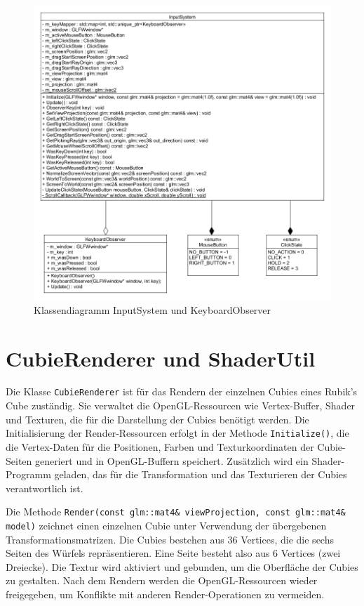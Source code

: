 \begin{figure} [H]
	\centering
	\includegraphics[scale=0.475]{images/InputSystemClassDia.png}
	\caption{Klassendiagramm InputSystem und KeyboardObserver}
	\label{InputSystemDia}
\end{figure}
\newpage
\section{CubieRenderer und ShaderUtil}
Die Klasse \texttt{CubieRenderer} ist für das Rendern der einzelnen Cubies eines Rubik's Cube zuständig. Sie verwaltet die OpenGL-Ressourcen wie Vertex-Buffer, Shader und Texturen, die für die Darstellung der Cubies benötigt werden. Die Initialisierung der Render-Ressourcen erfolgt in der Methode \texttt{Initialize()}, die die Vertex-Daten für die Positionen, Farben und Texturkoordinaten der Cubie-Seiten generiert und in OpenGL-Buffern speichert. Zusätzlich wird ein Shader-Programm geladen, das für die Transformation und das Texturieren der Cubies verantwortlich ist.

Die Methode \texttt{Render(const glm::mat4\& viewProjection, const glm::mat4\& model)} zeichnet einen einzelnen Cubie unter Verwendung der übergebenen Transformationsmatrizen. Die Cubies bestehen aus 36 Vertices, die die sechs Seiten des Würfels repräsentieren. Eine Seite besteht also aus 6 Vertices (zwei Dreiecke). Die Textur wird aktiviert und gebunden, um die Oberfläche der Cubies zu gestalten. Nach dem Rendern werden die OpenGL-Ressourcen wieder freigegeben, um Konflikte mit anderen Render-Operationen zu vermeiden.

